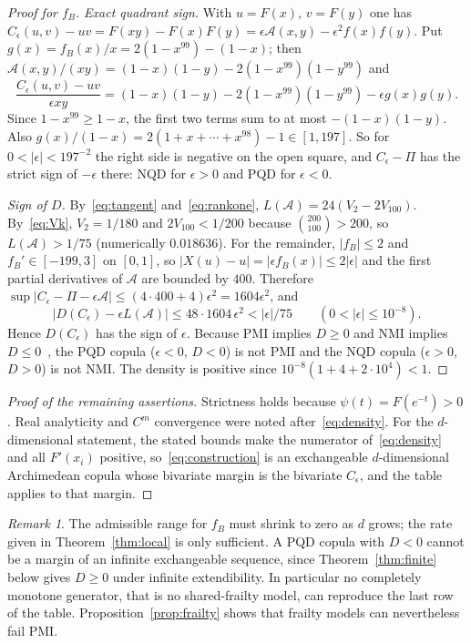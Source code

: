\documentclass[11pt,a4paper]{article}
\theoremstyle{remark}
\newtheorem{remark}[theorem]{Remark}
\begin{document}
\begin{proof}[Proof for $f_B$]
\emph{Exact quadrant sign.} With $u=F(x)$, $v=F(y)$ one has $C_\epsilon(u,v)-uv=F(xy)-F(x)F(y)=\epsilon\mathcal A(x,y)-\epsilon^2f(x)f(y)$. Put $g(x)=f_B(x)/x=2(1-x^{99})-(1-x)$; then $\mathcal A(x,y)/(xy)=(1-x)(1-y)-2(1-x^{99})(1-y^{99})$ and
\[
 \frac{C_\epsilon(u,v)-uv}{\epsilon xy}=(1-x)(1-y)-2(1-x^{99})(1-y^{99})-\epsilon g(x)g(y).
\]
Since $1-x^{99}\geq1-x$, the first two terms sum to at most $-(1-x)(1-y)$. Also $g(x)/(1-x)=2(1+x+\cdots+x^{98})-1\in[1,197]$. So for $0<|\epsilon|<197^{-2}$ the right side is negative on the open square, and $C_\epsilon-\Pi$ has the strict sign of $-\epsilon$ there: NQD for $\epsilon>0$ and PQD for $\epsilon<0$.

\emph{Sign of $D$.} By~\eqref{eq:tangent} and~\eqref{eq:rankone}, $L(\mathcal A)=24(V_2-2V_{100})$. By~\eqref{eq:Vk}, $V_2=1/180$ and $2V_{100}<1/200$ because $\binom{200}{100}>200$, so $L(\mathcal A)>1/75$ (numerically $0.018636$). For the remainder, $|f_B|\leq2$ and $f_B'\in[-199,3]$ on $[0,1]$, so $|X(u)-u|=|\epsilon f_B(x)|\leq2|\epsilon|$ and the first partial derivatives of $\mathcal A$ are bounded by $400$. Therefore $\sup|C_\epsilon-\Pi-\epsilon\mathcal A|\leq(4\cdot400+4)\epsilon^2=1604\epsilon^2$, and
\[
 |D(C_\epsilon)-\epsilon L(\mathcal A)|\leq48\cdot1604\,\epsilon^2<|\epsilon|/75\qquad(0<|\epsilon|\leq10^{-8}).
\]
Hence $D(C_\epsilon)$ has the sign of $\epsilon$. Because PMI implies $D\geq0$ and NMI implies $D\leq0$~\cite{FT}, the PQD copula ($\epsilon<0$, $D<0$) is not PMI and the NQD copula ($\epsilon>0$, $D>0$) is not NMI. The density is positive since $10^{-8}(1+4+2\cdot10^4)<1$.
\end{proof}

\begin{proof}[Proof of the remaining assertions]
Strictness holds because $\psi(t)=F(e^{-t})>0$. Real analyticity and $C^m$ convergence were noted after~\eqref{eq:density}. For the $d$-dimensional statement, the stated bounds make the numerator of~\eqref{eq:density} and all $F'(x_i)$ positive, so~\eqref{eq:construction} is an exchangeable $d$-dimensional Archimedean copula whose bivariate margin is the bivariate $C_\epsilon$, and the table applies to that margin.
\end{proof}

\begin{remark}\label{rem:shrink}
The admissible range for $f_B$ must shrink to zero as $d$ grows; the rate given in Theorem~\ref{thm:local} is only sufficient. A PQD copula with $D<0$ cannot be a margin of an infinite exchangeable sequence, since Theorem~\ref{thm:finite} below gives $D\geq0$ under infinite extendibility. In particular no completely monotone generator, that is no shared-frailty model, can reproduce the last row of the table. Proposition~\ref{prop:frailty} shows that frailty models can nevertheless fail PMI.
\end{remark}
\end{document}

